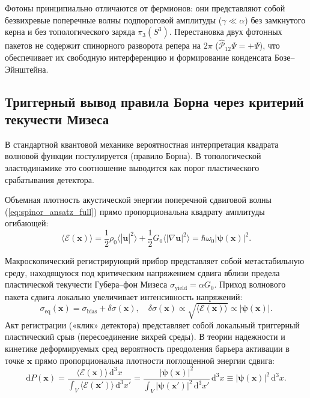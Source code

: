 \documentclass[11pt,a4paper]{article}
\theoremstyle{definition}
\theoremstyle{remark}
\begin{document}
Фотоны принципиально отличаются от фермионов: они представляют собой безвихревые поперечные волны подпороговой амплитуды ($\gamma \ll \alpha$) без замкнутого керна и без топологического заряда $\pi_3(S^3)$. Перестановка двух фотонных пакетов не содержит спинорного разворота репера на $2\pi$ ($\hat{\mathcal{P}}_{12}\Psi = +\Psi$), что обеспечивает их свободную интерференцию и формирование конденсата Бозе--Эйнштейна.

\subsection{Триггерный вывод правила Борна через критерий текучести Мизеса}
В стандартной квантовой механике вероятностная интерпретация квадрата волновой функции постулируется (правило Борна). В топологической эластодинамике это соотношение выводится как порог пластического срабатывания детектора.

Объемная плотность акустической энергии поперечной сдвиговой волны (\ref{eq:spinor_ansatz_full}) прямо пропорциональна квадрату амплитуды огибающей:
\begin{equation}
    \langle\mathcal{E}(\mathbf{x})\rangle = \frac{1}{2}\rho_0 \langle |\dot{\mathbf{u}}|^2 \rangle + \frac{1}{2}G_0 \langle |\nabla \mathbf{u}|^2 \rangle = \hbar \omega_0 |\boldsymbol{\psi}(\mathbf{x})|^2.
\end{equation}

Макроскопический регистрирующий прибор представляет собой метастабильную среду, находящуюся под критическим напряжением сдвига вблизи предела пластической текучести Губера--фон Мизеса $\sigma_{\mathrm{yield}} = \alpha G_0$. Приход волнового пакета сдвига локально увеличивает интенсивность напряжений:
\begin{equation}
    \sigma_{\mathrm{eq}}(\mathbf{x}) = \sigma_{\mathrm{bias}} + \delta \sigma(\mathbf{x}), \quad \delta \sigma(\mathbf{x}) \propto \sqrt{\langle\mathcal{E}(\mathbf{x})\rangle} \propto |\boldsymbol{\psi}(\mathbf{x})|.
\end{equation}
Акт регистрации («клик» детектора) представляет собой локальный триггерный пластический срыв (пересоединение вихрей среды). В теории надежности и кинетике деформируемых сред вероятность преодоления барьера активации в точке $\mathbf{x}$ прямо пропорциональна плотности поглощенной энергии сдвига:
\begin{equation}
    \mathrm{d}P(\mathbf{x}) = \frac{\langle\mathcal{E}(\mathbf{x})\rangle \, \mathrm{d}^3 x}{\int_V \langle\mathcal{E}(\mathbf{x}')\rangle \, \mathrm{d}^3 x'} = \frac{|\boldsymbol{\psi}(\mathbf{x})|^2}{\int_V |\boldsymbol{\psi}(\mathbf{x}')|^2 \, \mathrm{d}^3 x'} \, \mathrm{d}^3 x \equiv |\boldsymbol{\psi}(\mathbf{x})|^2 \, \mathrm{d}^3 x.
    \label{eq:born_rule_derived}
\end{equation}
\end{document}
